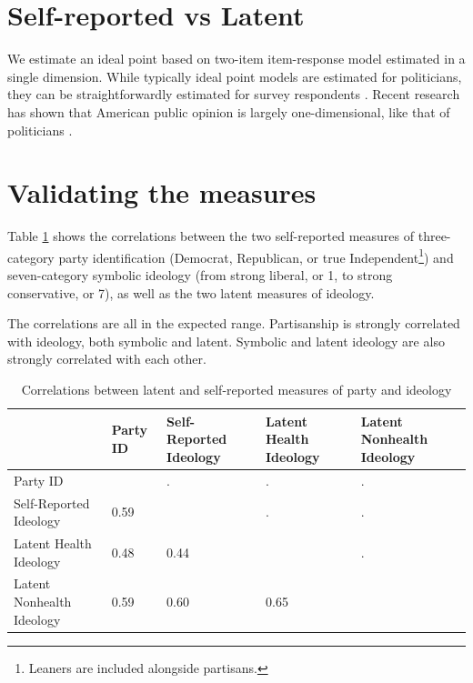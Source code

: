 \documentclass[
  oneside]{book}
\begin{document}
\hypertarget{self-reported-vs-latent}{%
\section{Self-reported vs Latent}\label{self-reported-vs-latent}}

We estimate an ideal point based on two-item item-response model \citep{Clinton:2004} estimated in a single dimension. While typically ideal point models are estimated for politicians, they can be straightforwardly estimated for survey respondents \citep{Jessee:2012}. Recent research has shown that American public opinion is largely one-dimensional, like that of politicians \citep{Fowler:2022}.

\hypertarget{validating-the-measures}{%
\section{Validating the measures}\label{validating-the-measures}}

Table \ref{tab:ideol-corr} shows the correlations between the two self-reported measures of three-category party identification (Democrat, Republican, or true Independent\footnote{Leaners are included alongside partisans.}) and seven-category symbolic ideology (from strong liberal, or 1, to strong conservative, or 7), as well as the two latent measures of ideology.

The correlations are all in the expected range. Partisanship is strongly correlated with ideology, both symbolic and latent. Symbolic and latent ideology are also strongly correlated with each other.

\begin{table}

\caption{\label{tab:ideol-corr}Correlations between latent and self-reported measures of party and ideology}
\centering
\begin{tabular}[t]{>{\raggedright\arraybackslash}p{1.5in}>{\raggedleft\arraybackslash}p{0.75in}>{\raggedleft\arraybackslash}p{0.75in}>{\raggedleft\arraybackslash}p{0.75in}>{\raggedleft\arraybackslash}p{0.75in}}
\toprule
  & Party ID & Self-Reported Ideology & Latent Health Ideology & Latent Nonhealth Ideology\\
\midrule
Party ID & 1 & . & . & .\\
Self-Reported Ideology & \num{.59} & 1 & . & .\\
Latent Health Ideology & \num{.48} & \num{.44} & 1 & .\\
Latent Nonhealth Ideology & \num{.59} & \num{.60} & \num{.65} & 1\\
\bottomrule
\end{tabular}
\end{table}
\end{document}
